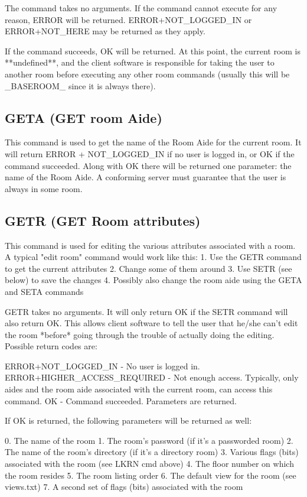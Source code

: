  The command takes no arguments.  If the command cannot execute for any
reason, ERROR will be returned.  ERROR+NOT_LOGGED_IN or ERROR+NOT_HERE may
be returned as they apply.

 If the command succeeds, OK will be returned.  At this point, the current
room is **undefined**, and the client software is responsible for taking
the user to another room before executing any other room commands (usually
this will be _BASEROOM_ since it is always there).



\subsection{GETA (GET room Aide)}

 This command is used to get the name of the Room Aide for the current room.
It will return ERROR + NOT_LOGGED_IN if no user is logged in, or OK if the
command succeeded.  Along with OK there will be returned one parameter: the
name of the Room Aide.  A conforming server must guarantee that the user is
always in some room.



\subsection{GETR (GET Room attributes)}

 This command is used for editing the various attributes associated with a
room.  A typical "edit room" command would work like this:
 1. Use the GETR command to get the current attributes
 2. Change some of them around
 3. Use SETR (see below) to save the changes
 4. Possibly also change the room aide using the GETA and SETA commands

 GETR takes no arguments.  It will only return OK if the SETR command will
also return OK.  This allows client software to tell the user that he/she
can't edit the room *before* going through the trouble of actually doing the
editing.  Possible return codes are:

 ERROR+NOT_LOGGED_IN          - No user is logged in.
 ERROR+HIGHER_ACCESS_REQUIRED - Not enough access.  Typically, only aides
and the room aide associated with the current room, can access this command.
 OK                           - Command succeeded.  Parameters are returned.

 If OK is returned, the following parameters will be returned as well:

 0. The name of the room
 1. The room's password (if it's a passworded room)
 2. The name of the room's directory (if it's a directory room)
 3. Various flags (bits) associated with the room (see LKRN cmd above)
 4. The floor number on which the room resides
 5. The room listing order
 6. The default view for the room (see views.txt)
 7. A second set of flags (bits) associated with the room



